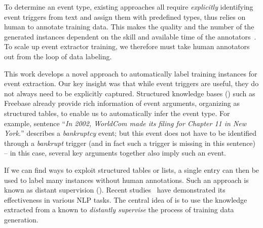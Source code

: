 To determine an event type, existing approaches  all require \emph{explicitly} identifying event triggers from text and assign them with predefined types, %
thus relies on human to annotate training data.
This makes the quality and the number of the generated instances dependent on the skill and available time of the
annotators~\cite{aguilar2014comparison,song2015light}. To scale up event extractor training, we therefore must take human annotators out
from the loop of data labeling.


This work develops a novel approach to automatically label training instances for event extraction. Our key insight was that while event
triggers are useful, they do not always need to be explicitly captured. Structured knowledge bases (\KBs) such as Freebase already provide
rich information of event arguments, organizing as structured tables, to enable us to automatically infer the event type. For example,
sentence ``\textit{In 2002, WorldCom made its filing for Chapter 11 in New York.}'' describes a \emph{bankruptcy} event; but this event
does not have to be identified through a \emph{bankrupt} trigger (and in fact such a trigger is missing in this sentence) -- in this case,
several key arguments together also imply such an event.



If we can find ways to exploit structured tables or lists, a single entry can then be used to label many instances without %
human annotations. Such an approach is known as distant supervision (\DS). Recent
studies~\cite{mintz2009distant,zeng2015distant} have demonstrated its effectiveness in various NLP tasks. The central idea of \DS is to use
the knowledge extracted from a known \KB to \emph{distantly supervise} the process of training data generation. %


